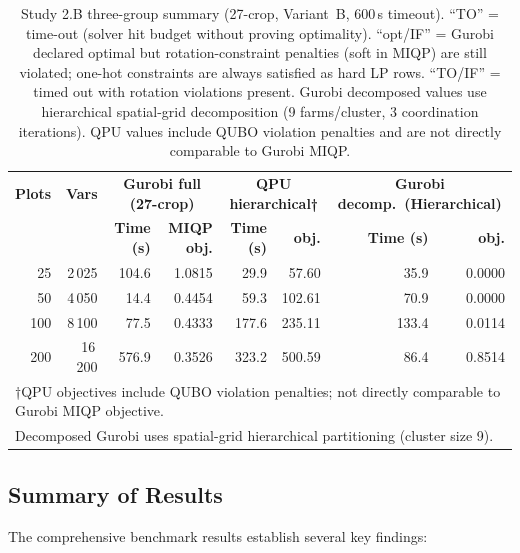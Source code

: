 \begin{table}[H]
\centering
\caption{Study 2.B three-group summary (27-crop, Variant~B, 600\,s timeout).
  ``TO'' = time-out (solver hit budget without proving optimality).
  ``opt/IF'' = Gurobi declared optimal but rotation-constraint penalties (soft in MIQP) are still violated;
  one-hot constraints are always satisfied as hard LP rows.
  ``TO/IF'' = timed out with rotation violations present.
  Gurobi decomposed values use hierarchical spatial-grid decomposition
  (9 farms/cluster, 3 coordination iterations).
  QPU values include QUBO violation penalties and are not directly comparable to Gurobi MIQP.}
\label{tab:study2b_three_group}
\small
\begin{tabular}{rrrrrrrr}
\toprule
\textbf{Plots} & \textbf{Vars} &
\multicolumn{2}{c}{\textbf{Gurobi full (27-crop)}} &
\multicolumn{2}{c}{\textbf{QPU hierarchical†}} &
\multicolumn{2}{c}{\textbf{Gurobi decomp.\ (Hierarchical)}} \\
& & \textbf{Time (s)} & \textbf{MIQP obj.} &
    \textbf{Time (s)} & \textbf{obj.} &
    \textbf{Time (s)} & \textbf{obj.} \\
\midrule
     25 &  2\,025 &  104.6         &  1.0815 &  29.9 &  57.60 & 35.9 & 0.0000 \\
     50 &  4\,050 &   14.4         &  0.4454 &  59.3 & 102.61 & 70.9 & 0.0000 \\
   100 &  8\,100 &   77.5         &  0.4333 & 177.6 & 235.11 & 133.4 & 0.0114 \\
   200 & 16\,200 &  576.9         &  0.3526 & 323.2 & 500.59 & 86.4 & 0.8514 \\
\bottomrule
\multicolumn{8}{l}{\footnotesize †QPU objectives include QUBO violation penalties; not directly comparable to Gurobi MIQP objective.} \\
\multicolumn{8}{l}{\footnotesize Decomposed Gurobi uses spatial-grid hierarchical partitioning (cluster size 9).} \\
\end{tabular}
\end{table}

\subsection{Summary of Results}

The comprehensive benchmark results establish several key findings:

